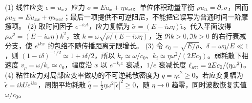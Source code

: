 (1) 线性应变 \(\epsilon=u_x\)，应力 \(\sigma=E u_x+\eta u_{xt}\)。单位体积动量平衡 \(\rho u_{tt}=\partial_x\sigma\)，因而 \(\rho u_{tt}=Eu_{xx}+\eta u_{xxt}\)；最后一项提供不可逆阻尼，不能把它误写为普通时间一阶摩擦项。
(2) 取时间因子 \(e^{-i\omega t}\)，应力复幅为 \(\tilde\sigma=(E-i\omega\eta)\tilde\epsilon\)。代入平面波得 \(\rho\omega^2=(E-i\omega\eta)k^2\)，故 \(k=\omega\sqrt{\rho/(E-i\omega\eta)}\)，选 \(\Re k>0,\Im k>0\) 的右行衰减分支，使 \(e^{ikx}\) 的包络不随传播距离无限增长。
(3) 令 \(c_0=\sqrt{E/\rho}\)、\(\delta=\omega\eta/E\ll1\)，则 \((1-i\delta)^{-1/2}\simeq1+i\delta/2\)，所以 \(k_r\simeq\omega/c_0\)、\(k_i\simeq\eta\omega^2/(2Ec_0)\)。弱耗散下相速度 \(v_p=\omega/k_r\simeq c_0\)，幅度沿 \(x\) 以 \(e^{-k_ix}\) 衰减，\(1/e\) 衰减长度 \(\ell_{\rm att}=2Ec_0/(\eta\omega^2)\)。
(4) 粘性应力对局部应变率做功的不可逆耗散密度为 \(\dot q=\eta\dot\epsilon^2\ge0\)。若应变复幅为 \(\tilde\epsilon=ikUe^{ikx}\)，周期平均耗散 \(\overline{\dot q}=\frac12\eta\omega^2|\tilde\epsilon|^2\ge0\)，随 \(\eta\to0\) 趋零，同时波数恢复实值 \(\omega/c_0\)。
